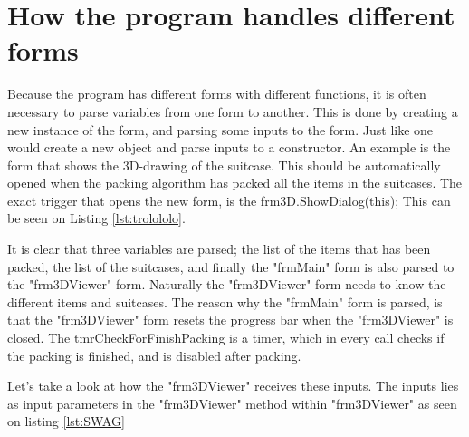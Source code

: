 \section{How the program handles different forms}

Because the program has different forms with different functions, it is often necessary to parse variables from one form to another. This is done by creating a new instance of the form, and parsing some inputs to the form. Just like one would create a new object and parse inputs to a constructor. An example is the form that shows the 3D-drawing of the suitcase. This should be automatically opened when the packing algorithm has packed all the items in the suitcases. The exact trigger that opens the new form, is the frm3D.ShowDialog(this); This can be seen on Listing \ref{lst:trolololo}. 


It is clear that three variables are parsed; the list of the items that has been packed, the list of the suitcases, and finally the "frmMain" form is also parsed to the "frm3DViewer" form. Naturally the "frm3DViewer" form needs to know the different items and suitcases. The reason why the "frmMain" form is parsed, is that the "frm3DViewer" form resets the progress bar when the "frm3DViewer" is closed. The tmrCheckForFinishPacking is a timer, which in every call checks if the packing is finished, and is disabled after packing.

Let's take a look at how the "frm3DViewer" receives these inputs. The inputs lies as input parameters in the "frm3DViewer" method within "frm3DViewer" as seen on listing \ref{lst:SWAG}

